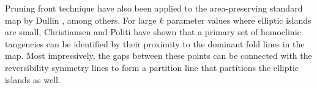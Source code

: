 {Pruning front technique have also been applied to the area-preserving
standard map by Dullin \etal{}, among others. For large
$k$ parameter values where elliptic islands are small, Christiansen and
Politi have shown that a primary set of homoclinic
tangencies can be identified by their proximity to the dominant fold
lines in the map. Most impressively, the gaps between these points can be
connected with the reversibility symmetry lines to form a partition
line that partitions the elliptic islands as
well.
} %


\RemarksEnd

